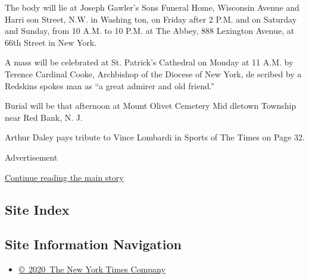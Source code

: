 The body will lie at Joseph Gawler's Sons Funeral Home, Wisconsin Avenue
and Harri son Street, N.W. in Washing ton, on Friday after 2 P.M. and on
Saturday and Sunday, from 10 A.M. to 10 P.M. at The Abbey, 888 Lexington
Avenue, at 66th Street in New York.

A mass will be celebrated at St. Patrick's Cathedral on Monday at 11
A.M. by Terence Cardinal Cooke, Archbishop of the Diocese of New York,
de scribed by a Redskins spokes man as ``a great admirer and old
friend.''

Burial will be that afternoon at Mount Olivet Cemetery Mid dletown
Township near Red Bank, N. J.

Arthur Daley pays tribute to Vince Lombardi in Sports of The Times on
Page 32.

Advertisement

\protect\hyperlink{after-bottom}{Continue reading the main story}

\hypertarget{site-index}{%
\subsection{Site Index}\label{site-index}}

\hypertarget{site-information-navigation}{%
\subsection{Site Information
Navigation}\label{site-information-navigation}}

\begin{itemize}
\tightlist
\item
  \href{https://help.nytimes3xbfgragh.onion/hc/en-us/articles/115014792127-Copyright-notice}{©~2020~The
  New York Times Company}
\end{itemize}

